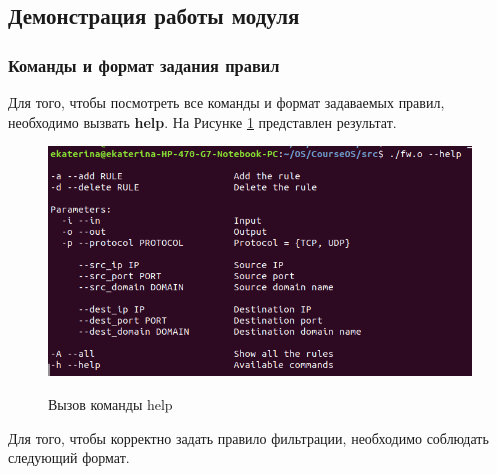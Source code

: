 \subsection{Демонстрация работы модуля} 

\subsubsection{Команды и формат задания правил}
Для того, чтобы посмотреть все команды и формат задаваемых правил, необходимо вызвать \textbf{help}. На Рисунке \ref{fig11:image} представлен результат.

\begin{figure}[h]
	\begin{center}
		{\includegraphics[scale = 0.6]{img/screenshots/help/help.png}}
		\caption{Вызов команды help}
		\label{fig11:image}
	\end{center}
\end{figure}
Для того, чтобы корректно задать правило фильтрации, необходимо соблюдать следующий формат.
